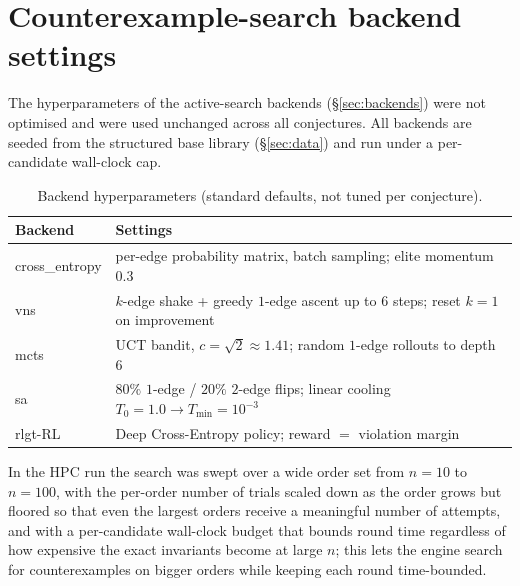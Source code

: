 \documentclass[]{ceurart}
\begin{document}
\section{Counterexample-search backend settings}
\label{app:hyperparams}
The hyperparameters of the active-search backends (\S\ref{sec:backends}) were not optimised and were used unchanged across all
conjectures. All backends are seeded from the structured base library (\S\ref{sec:data}) and run
under a per-candidate wall-clock cap.

\begin{table}[htbp]
  \caption{Backend hyperparameters (standard defaults, not tuned per conjecture).}
  \label{tab:hyperparams}
  \begin{tabular}{ll}
    \toprule
    Backend & Settings \\
    \midrule
    \textsf{cross\_entropy} & per-edge probability matrix, batch sampling; elite momentum $0.3$ \\
    \textsf{vns}            & $k$-edge shake + greedy $1$-edge ascent up to $6$ steps; reset $k{=}1$ on improvement \\
    \textsf{mcts}           & UCT bandit, $c=\sqrt{2}\approx1.41$; random $1$-edge rollouts to depth $6$ \\
    \textsf{sa}             & $80\%$ $1$-edge / $20\%$ $2$-edge flips; linear cooling $T_0=1.0\to T_{\min}=10^{-3}$ \\
    \textsf{rlgt-RL}        & Deep Cross-Entropy policy; reward $=$ violation margin \\
    \bottomrule
  \end{tabular}
\end{table}

In the HPC run the search was swept over a wide order set from $n = 10$ to $n = 100$, with the per-order number of trials scaled down as the order grows but floored so that even the largest orders receive a meaningful number of attempts, and with a per-candidate wall-clock budget that bounds round time regardless of how expensive the exact invariants become at
large $n$; this lets the engine search for counterexamples on bigger orders while
keeping each round time-bounded.
\end{document}
